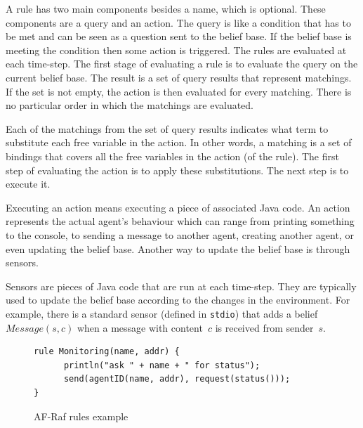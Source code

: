 \documentclass[a4paper,12pt,oneside,fleqn]{book} %
\begin{document}
{A rule has two main components besides a name, which is optional. These
components are a query and an action. The query is like a condition that
has to be met and can be seen as a question sent to the belief base. If the
belief base is meeting the condition then some action is triggered. The
rules are evaluated at each time-step. The first stage of evaluating a rule
is to evaluate the query on the current belief base. The result is a set of
query results that represent matchings. If the set is not empty, the
action is then evaluated for every matching. There is no particular order
in which the matchings are evaluated. 

Each of the matchings from the set of query results indicates what term
to substitute each free variable in the action. In other words, a matching
is a set of bindings that covers all the free variables in the action (of
the rule). The first step of evaluating the action is to apply these
substitutions. The next step is to execute it.

Executing an action means executing a piece of associated Java code.
An action represents the actual agent's behaviour which can
range from printing something to the console, to sending a message to
another agent, creating another agent, or even updating the belief base.
Another way to update the belief base is through sensors.

Sensors are pieces of Java code that are run at each time-step. They are
typically used to update the belief base according to the changes in the
environment. For example, there is a standard sensor (defined in
\texttt{stdio}) that adds a belief $\mathit{Message}(s,c)$ when a message
with content~$c$ is received from sender~$s$.



\begin{figure}\footnotesize %
\begin{verbatim}
rule Monitoring(name, addr) {
      println("ask " + name + " for status");
      send(agentID(name, addr), request(status()));
}
\end{verbatim}
\caption{AF-Raf rules example}
\label{fig:rule}
\end{figure} %

}
\end{document}
